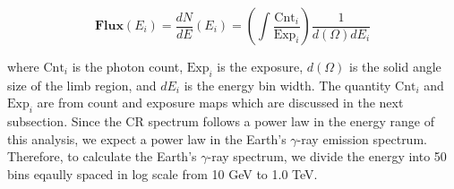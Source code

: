 \begin{equation}
    \textbf{Flux}(E_i) =  \frac{dN}{dE}(E_i) = \left(\int \frac{\text{Cnt}_i}{\text{Exp}_i}\right) \frac{1}{d(\Omega)dE_i}
    \label{eq:def_flux}
\end{equation}

where $\text{Cnt}_i$ is the photon count,
$\text{Exp}_i$ is the exposure, $d(\Omega)$
is the solid angle size of the limb region, and $dE_i$ is the energy
bin width. The quantity $\text{Cnt}_i$ and $\text{Exp}_i$ 
are from count and exposure
maps which are discussed in the next subsection.
Since the CR spectrum follows a power law in the energy range
of this analysis, we expect a power law in the Earth's
$\gamma$-ray emission spectrum. Therefore, to calculate the
Earth's $\gamma$-ray spectrum, we divide the energy into 50 bins
eqaully spaced in log scale from 10 GeV to 1.0 TeV.



